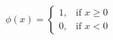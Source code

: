 
\begin{equation} \label{threshold:fun}
  \phi(x) =
  \left\{
      \begin{array}{ll}
        1, & \mbox{if } x \geq 0 \\
        0, & \mbox{if } x < 0
      \end{array}
  \right.
\end{equation}